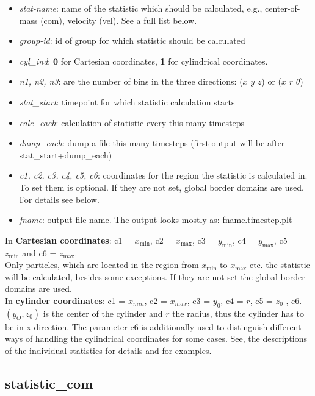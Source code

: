 \documentclass[a4paper,10pt]{scrreprt}
\begin{document}
\begin{itemize}
\item \textit{stat-name}: name of the statistic which should be calculated, e.g., center-of-mass (com), velocity (vel). See a full list below.
\item \textit{group-id}: id of group for which statistic should be calculated
\item \textit{cyl\_ind}: $\textbf{0}$ for Cartesian coordinates, {\bfseries 1} for cylindrical coordinates.
\item \textit{n1, n2, n3}: are the number of bins in the three directions: ($x$ $y$ $z$) or ($x$ $r$ $\theta$)
\item \textit{stat\_start}: timepoint for which statistic calculation starts
\item \textit{calc\_each}: calculation of statistic every this many timesteps
\item \textit{dump\_each}: dump a file this many timesteps (first output will be after stat\_start+dump\_each)
\item \textit{c1, c2, c3, c4, c5, c6}: coordinates for the region the statistic is calculated in. To set them is optional. If they are not set, global border domains are used. For details see below.
\item \textit{fname}: output file name. The output looks mostly as: fname.timestep.plt
\end{itemize}

In \textbf{Cartesian coordinates}: c1 = $x_\mathrm{min}$, c2 = $x_\mathrm{max}$, c3 = $y_\mathrm{min}$, c4 = $y_\mathrm{max}$, c5 = $z_\mathrm{min} $ and c6 = $z_\mathrm{max}$.\\
Only particles, which are located in the region from $x_\mathrm{min}$ to $x_\mathrm{max}$ etc. the statistic will be calculated, besides some exceptions.
If they are not set the global border domains are used.
\\[2ex]
In \textbf{cylinder coordinates}: c1 = $x_{min}$, c2 = $x_{max}$, c3 = $y_0$, c4 = $r$, c5 = $z_0$ , c6.\\
$(y_O, z_0)$ is the center of the cylinder and $r$ the radius, thus the cylinder has to be in x-direction.
The parameter c6 is additionally used to distinguish different ways of handling the cylindrical coordinates for some cases.
See, the descriptions of the individual statistics for details and for examples.


\subsection{statistic\_com}
\end{document}
